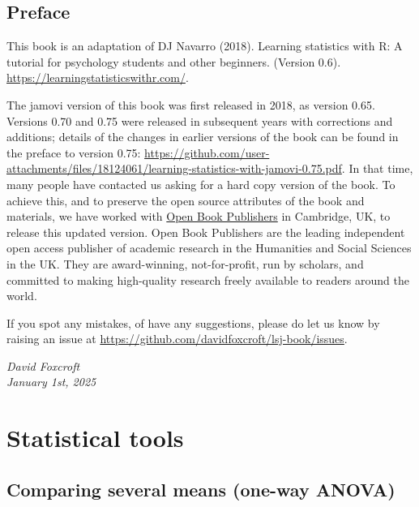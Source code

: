\documentclass[
  a4paper,
]{book}
\renewcommand*\contentsname{Table of contents}
\newcommand\contentsname{Table of contents}
\begin{document}
\renewcommand*\contentsname{Table of contents}
{
\hypersetup{linkcolor=}
\setcounter{tocdepth}{2}
\tableofcontents
}
\mainmatter
{}

\hypertarget{preface}{%
\chapter*{Preface}\label{preface}}


This book is an adaptation of DJ Navarro (2018). Learning statistics
with R: A tutorial for psychology students and other beginners. (Version
0.6). \url{https://learningstatisticswithr.com/}.

The jamovi version of this book was first released in 2018, as version
0.65. Versions 0.70 and 0.75 were released in subsequent years with
corrections and additions; details of the changes in earlier versions of
the book can be found in the preface to version 0.75:
\url{https://github.com/user-attachments/files/18124061/learning-statistics-with-jamovi-0.75.pdf}.
In that time, many people have contacted us asking for a hard copy
version of the book. To achieve this, and to preserve the open source
attributes of the book and materials, we have worked with
\href{https://www.openbookpublishers.com/books/10.11647/obp.0333}{Open
Book Publishers} in Cambridge, UK, to release this updated version. Open
Book Publishers are the leading independent open access publisher of
academic research in the Humanities and Social Sciences in the UK. They
are award-winning, not-for-profit, run by scholars, and committed to
making high-quality research freely available to readers around the
world.

If you spot any mistakes, of have any suggestions, please do let us know
by raising an issue at
\url{https://github.com/davidfoxcroft/lsj-book/issues}.

\emph{David Foxcroft\\
January 1st, 2025}

\part{Statistical tools}

\hypertarget{sec-Comparing-several-means-one-way-ANOVA}{%
\chapter{Comparing several means (one-way
ANOVA)}\label{sec-Comparing-several-means-one-way-ANOVA}}
\end{document}
